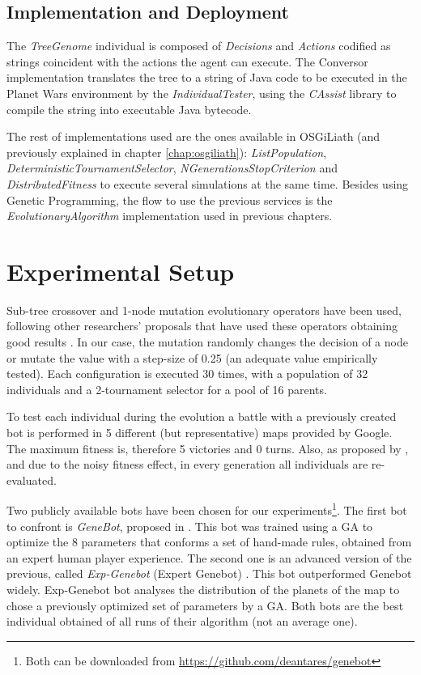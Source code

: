 {\subsection{Implementation and Deployment}

The {\em TreeGenome} individual is composed of {\em Decisions} and {\em Actions} codified as strings coincident with the actions the agent can execute. The {Conversor} implementation translates the tree to a string of Java code to be executed in the Planet Wars environment by the {\em IndividualTester}, using the {\em CAssist} library to compile the string into executable Java bytecode.

The rest of implementations used are the ones available in OSGiLiath (and previously explained in chapter \ref{chap:osgiliath}): {\em ListPopulation}, {\em DeterministicTournamentSelector}, {\em NGenerationsStopCriterion} and {\em DistributedFitness} to execute several simulations at the same time. Besides using Genetic Programming, the flow to use the previous services is the {\em EvolutionaryAlgorithm} implementation used in previous chapters.



\section{Experimental Setup}
\label{sec:experiments}

Sub-tree crossover and 1-node mutation evolutionary operators have been used, following other researchers' proposals that have used these operators obtaining good results \cite{Esparcia2013GPunreal}. In our case, the mutation randomly changes the decision of a node or mutate the value with a step-size of 0.25 (an adequate value empirically tested). Each configuration is executed 30 times, with a population of 32 individuals and a 2-tournament selector for a pool of 16 parents.

To test each individual during the evolution a battle with a previously created bot is performed in 5 different (but representative) maps provided by Google. The maximum fitness is, therefore 5 victories and 0 turns. Also, as proposed by \cite{Mora2012Genebot}, and due to the noisy fitness effect, in every generation all individuals are re-evaluated.


Two publicly available bots have been chosen for our experiments\footnote{Both can be downloaded from \url{https://github.com/deantares/genebot}}. The first bot to confront is {\em GeneBot}, proposed in \cite{Mora2012Genebot}. This bot was trained using a GA to optimize the 8 parameters that conforms a set of hand-made rules, obtained from an expert human player experience. The second one is an advanced version of the previous, called {\em Exp-Genebot} (Expert Genebot) \cite{FernandezAres2012adaptive}. This bot outperformed Genebot widely. Exp-Genebot bot analyses the distribution of the planets of the map to chose a previously optimized set of parameters by a GA.  Both bots are the best individual obtained of all runs of their algorithm (not an average one).

}
